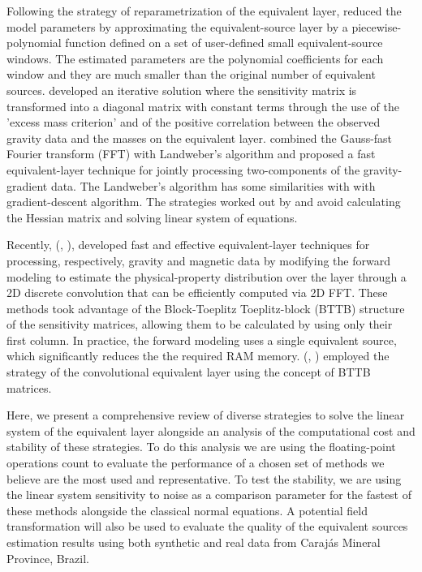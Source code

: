 Following the strategy of reparametrization of the equivalent layer, \cite{oliveirajr-etal2013} reduced the model parameters by approximating the equivalent-source layer by a piecewise-polynomial function defined on a set of user-defined small equivalent-source windows. The estimated parameters are the polynomial coefficients for each window and they are much smaller than the original number of equivalent sources. \cite{siqueira-etal2017} developed an iterative solution where the sensitivity matrix is transformed into a diagonal matrix with constant terms through the use of the 'excess mass criterion' and of the positive correlation between the observed gravity data and the masses on the equivalent layer. \cite{jirigalatu-ebbing2019} combined the Gauss-fast Fourier transform (FFT) with Landweber's algorithm and proposed a fast equivalent-layer technique for jointly processing two-components of the gravity-gradient data.
The Landweber's algorithm has some similarities with with gradient-descent algorithm. The strategies worked out by \cite{siqueira-etal2017} and \cite{jirigalatu-ebbing2019} avoid calculating the Hessian matrix and solving linear system of equations.

Recently, \citeauthor{takahashi2020} (\citeyear{takahashi2020}, \citeyear{takahashi2022}), developed fast and effective equivalent-layer techniques for processing, respectively,  gravity and magnetic data by modifying the forward modeling to estimate the physical-property distribution  over the layer through a 2D discrete convolution that can be efficiently computed via 2D FFT.
These methods took advantage of the Block-Toeplitz Toeplitz-block (BTTB) structure of the sensitivity matrices, allowing them to be calculated by using only their first column.
In practice, the forward modeling uses a single equivalent source, which significantly reduces the the required RAM memory. \citeauthor{takahashi2020} (\citeyear{takahashi2020}, \citeyear{takahashi2022}) employed the strategy of the convolutional equivalent layer using the concept of  BTTB matrices.

Here, we present a comprehensive review of diverse strategies to solve the linear system of the equivalent layer alongside an analysis of the computational cost and stability of these strategies. To do this analysis we are using the floating-point operations count to evaluate the performance of a chosen set of methods we believe are the most used and representative. To test the stability, we are using the linear system sensitivity to noise as a comparison parameter for the fastest of these methods alongside the classical normal equations. A potential field transformation will also be used to evaluate the quality of the equivalent sources estimation results using both synthetic and real data from Carajás Mineral Province, Brazil.
